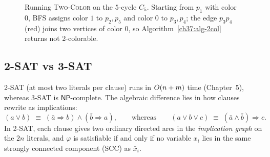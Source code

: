 \begin{figure}[htbp]
\centering
{}
\caption{Running \textsc{Two-Color} on the $5$-cycle $C_5$. Starting from $p_1$ with color $0$, BFS assigns color $1$ to $p_2, p_5$ and color $0$ to $p_3, p_4$; the edge $p_3p_4$ (red) joins two vertices of color $0$, so Algorithm~\ref{ch37:alg-2col} returns \textsf{not 2-colorable}.}
\label{ch37:fig-2col}
\end{figure}

\subsection{2-SAT vs 3-SAT}

\textsc{2-SAT} (at most two literals per clause) runs in $O(n+m)$ time (Chapter~5), whereas \textsc{3-SAT} is
$\mathsf{NP}$-complete. The algebraic difference lies in how clauses rewrite as implications:
\[
  (a \vee b) \;\equiv\; (\bar{a}\Rightarrow b) \wedge (\bar{b}\Rightarrow a),
  \qquad\text{whereas}\qquad
  (a \vee b \vee c) \;\equiv\; (\bar{a}\wedge\bar{b})\Rightarrow c.
\]
In \textsc{2-SAT}, each clause gives two ordinary directed arcs in the \emph{implication graph} on the $2n$ literals, and $\varphi$ is
satisfiable if and only if no variable $x_i$ lies in the same strongly connected component (SCC) as $\bar{x}_i$.

